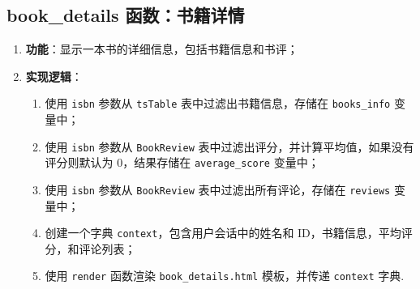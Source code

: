 \documentclass{ctexart}
\begin{document}
\subsection{book\_details 函数：书籍详情}
\begin{enumerate}
    \item \textbf{功能}：显示一本书的详细信息，包括书籍信息和书评；
    \item \textbf{实现逻辑}：
    \begin{enumerate}
        \item 使用 \texttt{isbn} 参数从 \texttt{tsTable} 表中过滤出书籍信息，存储在 \texttt{books\_info} 变量中；
        \item 使用 \texttt{isbn} 参数从 \texttt{BookReview} 表中过滤出评分，并计算平均值，如果没有评分则默认为 0，结果存储在 \texttt{average\_score} 变量中；
        \item 使用 \texttt{isbn} 参数从 \texttt{BookReview} 表中过滤出所有评论，存储在 \texttt{reviews} 变量中；
        \item 创建一个字典 \texttt{context}，包含用户会话中的姓名和 ID，书籍信息，平均评分，和评论列表；
        \item 使用 \texttt{render} 函数渲染 \texttt{book\_details.html} 模板，并传递 \texttt{context} 字典.
    \end{enumerate}
\end{enumerate}
\end{document}
